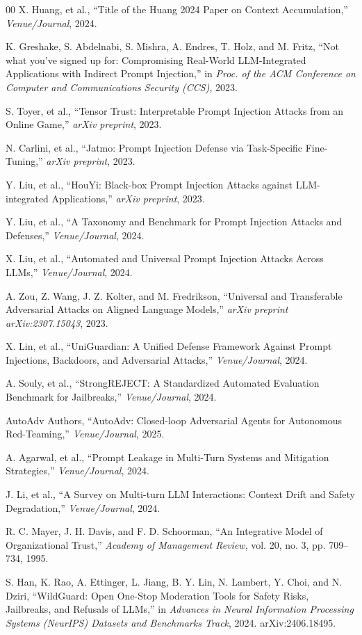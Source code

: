 \documentclass[10pt, a4paper, twocolumn]{article}
\begin{document}
\begin{thebibliography}{00}
X. Huang, et al., ``Title of the Huang 2024 Paper on Context Accumulation,'' \textit{Venue/Journal}, 2024.

K. Greshake, S. Abdelnabi, S. Mishra, A. Endres, T. Holz, and M. Fritz, ``Not what you've signed up for: Compromising Real-World LLM-Integrated Applications with Indirect Prompt Injection,'' in \textit{Proc. of the ACM Conference on Computer and Communications Security (CCS)}, 2023.

S. Toyer, et al., ``Tensor Trust: Interpretable Prompt Injection Attacks from an Online Game,'' \textit{arXiv preprint}, 2023.

N. Carlini, et al., ``Jatmo: Prompt Injection Defense via Task-Specific Fine-Tuning,'' \textit{arXiv preprint}, 2023.

Y. Liu, et al., ``HouYi: Black-box Prompt Injection Attacks against LLM-integrated Applications,'' \textit{arXiv preprint}, 2023.

Y. Liu, et al., ``A Taxonomy and Benchmark for Prompt Injection Attacks and Defenses,'' \textit{Venue/Journal}, 2024.

X. Liu, et al., ``Automated and Universal Prompt Injection Attacks Across LLMs,'' \textit{Venue/Journal}, 2024.

A. Zou, Z. Wang, J. Z. Kolter, and M. Fredrikson, ``Universal and Transferable Adversarial Attacks on Aligned Language Models,'' \textit{arXiv preprint arXiv:2307.15043}, 2023.

X. Lin, et al., ``UniGuardian: A Unified Defense Framework Against Prompt Injections, Backdoors, and Adversarial Attacks,'' \textit{Venue/Journal}, 2024.

A. Souly, et al., ``StrongREJECT: A Standardized Automated Evaluation Benchmark for Jailbreaks,'' \textit{Venue/Journal}, 2024.

AutoAdv Authors, ``AutoAdv: Closed-loop Adversarial Agents for Autonomous Red-Teaming,'' \textit{Venue/Journal}, 2025.

A. Agarwal, et al., ``Prompt Leakage in Multi-Turn Systems and Mitigation Strategies,'' \textit{Venue/Journal}, 2024.

J. Li, et al., ``A Survey on Multi-turn LLM Interactions: Context Drift and Safety Degradation,'' \textit{Venue/Journal}, 2024.

R. C. Mayer, J. H. Davis, and F. D. Schoorman, ``An Integrative Model of Organizational Trust,'' \textit{Academy of Management Review}, vol. 20, no. 3, pp. 709--734, 1995.

S. Han, K. Rao, A. Ettinger, L. Jiang, B. Y. Lin, N. Lambert, Y. Choi, and N. Dziri, ``WildGuard: Open One-Stop Moderation Tools for Safety Risks, Jailbreaks, and Refusals of LLMs,'' in \textit{Advances in Neural Information Processing Systems (NeurIPS) Datasets and Benchmarks Track}, 2024. arXiv:2406.18495.

\end{thebibliography}
\end{document}
